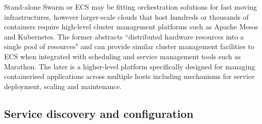 \documentclass{article}
\begin{document}
\par
Stand-alone Swarm or ECS may be fitting orchestration solutions for fast moving infrastructures, however larger-scale clouds that host hundreds or thousands of containers require high-level cluster management platforms such as Apache Mesos and Kubernetes. The former abstracts ``distributed hardware resources into
a single pool of resources" and can provide similar cluster management facilities to ECS when integrated with scheduling and service management tools such as Marathon. The later is a higher-level platform specifically designed for managing containerised applications across multiple hosts including mechanisms for service deployment, scaling and maintenance.

\subsection{Service discovery and configuration}
\end{document}
